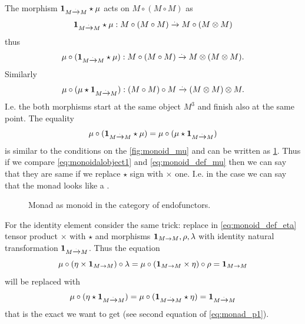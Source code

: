 The morphism $\mathbf{1}_{ M \xrightarrow{.} M } \star \mu$ acts on $M \circ ( M \circ M )$ as
\[
\mathbf{1}_{ M \xrightarrow{.} M } \star \mu : M \circ ( M \circ M ) \xrightarrow{.} M \circ (M \otimes M)
\]
thus
\[
\mu \circ (\mathbf{1}_{ M \xrightarrow{.} M } \star \mu) : M \circ ( M \circ M ) \xrightarrow{.} M \otimes (M \otimes M).
\]
Similarly 
\[
\mu \circ (\mu \star \mathbf{1}_{ M \xrightarrow{.} M }) : (M \circ  M) \circ M  \xrightarrow{.} ( M \otimes M) \otimes M.
\]
I.e. the both morphisms start at the same object $M^3$ and finish also
at the same point. The equality 
\begin{equation}
\mu \circ (\mathbf{1}_{ M \xrightarrow{.} M } \star \mu) = 
\mu \circ (\mu \star \mathbf{1}_{ M \xrightarrow{.} M })
\label{eq:monoidalobject1}
\end{equation}
is similar to the conditions on the \cref{fig:monoid_mu} and can be
written as \cref{fig:monad_monoid1}. Thus if we compare
\eqref{eq:monoidalobject1} and \eqref{eq:monoid_def_mu} then we can say
that they are same if we replace $\star$ sign with $\times$ one. I.e.
in the case we can say that the monad looks like a
. 

\begin{figure}
  \centering
  \caption{Monad as monoid in the category of endofunctors.}
  \label{fig:monad_monoid1}
\end{figure}

For the identity element consider the same trick: replace in
\eqref{eq:monoid_def_eta} tensor
product $\times$ with  $\star$ and
morphisms $\mathbf{1}_{ M \to M }, \rho, \lambda$ with identity natural transformation
$\mathbf{1}_{ M \xrightarrow{.} M }$. Thus the equation
\[
\mu \circ (\eta \times \mathbf{1}_{ M \to M })
\circ \lambda = \mu \circ (\mathbf{1}_{ M \to M } \times \eta) \circ \rho =
\mathbf{1}_{ M \to M }
\]
will be replaced with
\[
\mu \circ (\eta \star \mathbf{1}_{ M \xrightarrow{.} M }) = \mu \circ (\mathbf{1}_{ M \xrightarrow{.} M } \star \eta) =
\mathbf{1}_{ M \xrightarrow{.} M }
\]
that is the exact we want to get (see second equation of
\eqref{eq:monad_p1}). 

